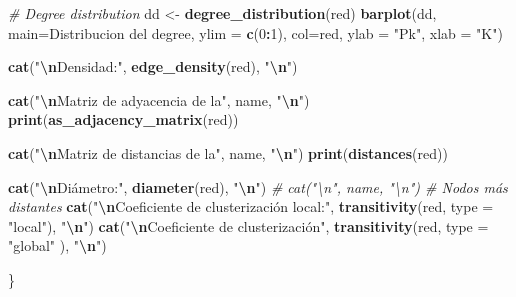 \documentclass[
]{article}
\newenvironment{Shaded}{\begin{snugshade}}{\end{snugshade}}
\newcommand{\AttributeTok}[1]{\textcolor[rgb]{0.13,0.29,0.53}{#1}}
\newcommand{\CommentTok}[1]{\textcolor[rgb]{0.56,0.35,0.01}{\textit{#1}}}
\newcommand{\DecValTok}[1]{\textcolor[rgb]{0.00,0.00,0.81}{#1}}
\newcommand{\FunctionTok}[1]{\textcolor[rgb]{0.13,0.29,0.53}{\textbf{#1}}}
\newcommand{\NormalTok}[1]{#1}
\newcommand{\OtherTok}[1]{\textcolor[rgb]{0.56,0.35,0.01}{#1}}
\newcommand{\SpecialCharTok}[1]{\textcolor[rgb]{0.81,0.36,0.00}{\textbf{#1}}}
\newcommand{\StringTok}[1]{\textcolor[rgb]{0.31,0.60,0.02}{#1}}
\begin{document}
\begin{Shaded}
\begin{Highlighting}[]
  \CommentTok{\# Degree distribution}
\NormalTok{  dd }\OtherTok{\textless{}{-}} \FunctionTok{degree\_distribution}\NormalTok{(red)}
  \FunctionTok{barplot}\NormalTok{(dd, }\AttributeTok{main=}\StringTok{\textquotesingle{}Distribucion del degree\textquotesingle{}}\NormalTok{, }\AttributeTok{ylim =} \FunctionTok{c}\NormalTok{(}\DecValTok{0}\SpecialCharTok{:}\DecValTok{1}\NormalTok{), }\AttributeTok{col=}\StringTok{\textquotesingle{}red\textquotesingle{}}\NormalTok{, }\AttributeTok{ylab =} \StringTok{"Pk"}\NormalTok{, }\AttributeTok{xlab =} \StringTok{"K"}\NormalTok{)}
  
  \FunctionTok{cat}\NormalTok{(}\StringTok{"}\SpecialCharTok{\textbackslash{}n}\StringTok{Densidad:"}\NormalTok{, }\FunctionTok{edge\_density}\NormalTok{(red), }\StringTok{"}\SpecialCharTok{\textbackslash{}n}\StringTok{"}\NormalTok{)}
  
  \FunctionTok{cat}\NormalTok{(}\StringTok{"}\SpecialCharTok{\textbackslash{}n}\StringTok{Matriz de adyacencia de la"}\NormalTok{, name, }\StringTok{"}\SpecialCharTok{\textbackslash{}n}\StringTok{"}\NormalTok{)}
  \FunctionTok{print}\NormalTok{(}\FunctionTok{as\_adjacency\_matrix}\NormalTok{(red))}
  
  \FunctionTok{cat}\NormalTok{(}\StringTok{"}\SpecialCharTok{\textbackslash{}n}\StringTok{Matriz de distancias de la"}\NormalTok{, name, }\StringTok{"}\SpecialCharTok{\textbackslash{}n}\StringTok{"}\NormalTok{)}
  \FunctionTok{print}\NormalTok{(}\FunctionTok{distances}\NormalTok{(red))}
  
  \FunctionTok{cat}\NormalTok{(}\StringTok{"}\SpecialCharTok{\textbackslash{}n}\StringTok{Diámetro:"}\NormalTok{, }\FunctionTok{diameter}\NormalTok{(red), }\StringTok{"}\SpecialCharTok{\textbackslash{}n}\StringTok{"}\NormalTok{) }
  \CommentTok{\# cat("\textbackslash{}n", name, "\textbackslash{}n") \# Nodos más distantes}
  \FunctionTok{cat}\NormalTok{(}\StringTok{"}\SpecialCharTok{\textbackslash{}n}\StringTok{Coeficiente de clusterización local:"}\NormalTok{, }\FunctionTok{transitivity}\NormalTok{(red, }\AttributeTok{type =} \StringTok{"local"}\NormalTok{), }\StringTok{"}\SpecialCharTok{\textbackslash{}n}\StringTok{"}\NormalTok{)}
  \FunctionTok{cat}\NormalTok{(}\StringTok{"}\SpecialCharTok{\textbackslash{}n}\StringTok{Coeficiente de clusterización"}\NormalTok{, }\FunctionTok{transitivity}\NormalTok{(red, }\AttributeTok{type =} \StringTok{"global"}\NormalTok{ ), }\StringTok{"}\SpecialCharTok{\textbackslash{}n}\StringTok{"}\NormalTok{)}
  
\NormalTok{\}}
\end{Highlighting}
\end{Shaded}
\end{document}
